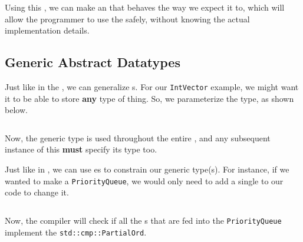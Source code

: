 Using this , we can make an  that behaves the way we expect it to, which will allow the programmer to use the  safely, without knowing the actual implementation details.

\subsection{Generic Abstract Datatypes}\label{subsec:Generic_Abstract_Datatypes}
Just like in the , we can generalize s.
For our \texttt{IntVector} example, we might want it to be able to store \textbf{any} type of thing.
So, we parameterize the  type, as shown below.
\inputminted[frame=lines,linenos]{rust}{./EDAP05-Concepts_Programming_Languages-Sections/Abstract_Data_Types/Code/Generic_Vector.rs}

Now, the generic type  is used throughout the entire , and any subsequent instance of this  \textbf{must} specify its type too.

Just like in , we can use es to constrain our generic type(s).
For instance, if we wanted to make a \texttt{PriorityQueue}, we would only need to add a single  to our \texttt{} code to change it.
\inputminted[frame=lines,linenos]{rust}{./EDAP05-Concepts_Programming_Languages-Sections/Abstract_Data_Types/Code/PriorityQueue.rs}

Now, the compiler will check if all the s that are fed into the \texttt{PriorityQueue} implement the  \texttt{std::cmp::PartialOrd}.





